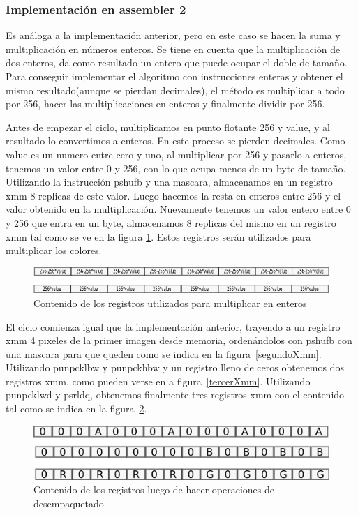 \documentclass[a4paper]{article}
\begin{document}
\subsubsection{Implementación en assembler 2}

Es análoga a la implementación anterior, pero en este caso se hacen la suma y multiplicación en números enteros. Se tiene en cuenta que la multiplicación de dos enteros, da como resultado un entero que puede ocupar el doble de tamaño. Para conseguir implementar el algoritmo con instrucciones enteras y obtener el mismo resultado(aunque se pierdan decimales), el método es multiplicar a todo por 256, hacer las multiplicaciones en enteros y finalmente dividir por 256.

Antes de empezar el ciclo, multiplicamos en punto flotante 256 y value, y al resultado lo convertimos a enteros. En este proceso se pierden decimales. Como value es un numero entre cero y uno, al multiplicar por 256 y pasarlo a enteros, tenemos un valor entre 0 y 256, con lo que ocupa menos de un byte de tamaño. Utilizando la instrucción pshufb y una mascara, almacenamos en un registro xmm 8 replicas de este valor. Luego hacemos la resta en enteros entre 256 y el valor obtenido en la multiplicación. Nuevamente tenemos un valor entero entre 0 y 256 que entra en un byte, almacenamos 8 replicas del mismo en un registro xmm tal como se ve en la figura \ref{256value}. Estos registros serán utilizados para multiplicar los colores.

\begin{figure}[H]
\centering
\includegraphics[scale=0.8]{imagenes/256value.png}
\caption{Contenido de los registros utilizados para multiplicar en enteros}
\label{256value}
\end{figure}

El ciclo comienza igual que la implementación anterior, trayendo a un registro xmm 4 pixeles de la primer imagen desde memoria, ordenándolos con pshufb con una mascara para que queden como se indica en la figura~\ref{segundoXmm}. Utilizando punpcklbw y punpckhbw y un registro lleno de ceros obtenemos dos registros xmm, como pueden verse en a figura~\ref{tercerXmm}. Utilizando punpcklwd y psrldq, obtenemos finalmente tres registros xmm con el contenido tal como se indica en la figura~\ref{xmmAsm2}.

\begin{figure}[H]
\centering
\includegraphics[scale=0.8]{imagenes/xmmAsm2.png}
\caption{Contenido de los registros luego de hacer operaciones de desempaquetado}
\label{xmmAsm2}
\end{figure}
\end{document}

